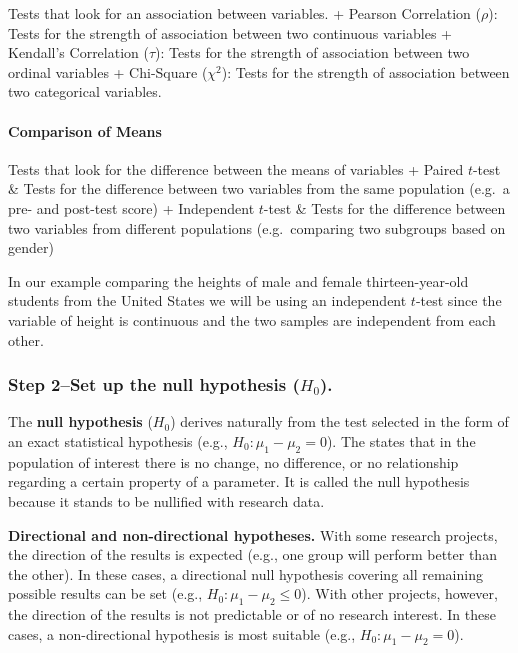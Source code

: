 \documentclass[
]{book}
\theoremstyle{definition}
\theoremstyle{definition}
\theoremstyle{definition}
\theoremstyle{definition}
\theoremstyle{remark}
\begin{document}
Tests that look for an association between variables.
+ Pearson Correlation (\(\rho\)): Tests for the strength of association between two continuous variables
+ Kendall's Correlation (\(\tau\)): Tests for the strength of association between two ordinal variables
+ Chi-Square (\(\chi^2\)): Tests for the strength of association between two categorical variables.

\hypertarget{comparison-of-means}{%
\paragraph*{Comparison of Means}\label{comparison-of-means}}

Tests that look for the difference between the means of variables
+ Paired \(t\)-test \& Tests for the difference between two variables from the same population (e.g.~a pre- and post-test score)
+ Independent \(t\)-test \& Tests for the difference between two variables from different populations (e.g.~comparing two subgroups based on gender)

In our example comparing the heights of male and female thirteen-year-old students from the United States we will be using an independent \(t\)-test since the variable of height is continuous and the two samples are independent from each other.

\hypertarget{step-2set-up-the-null-hypothesis-h_0.}{%
\subsubsection*{\texorpdfstring{Step 2--Set up the null hypothesis (\(H_0\)).}{Step 2--Set up the null hypothesis (H\_0).}}\label{step-2set-up-the-null-hypothesis-h_0.}}

The \textbf{null hypothesis} (\(H_0\)) derives naturally from the test selected in the form of an exact statistical hypothesis (e.g., \(H_0: \mu_1-\mu_2 = 0\)). The states that in the population of interest there is no change, no difference, or no relationship regarding a certain property of a parameter. It is called the null hypothesis because it stands to be nullified with research data.

\textbf{Directional and non-directional hypotheses.} With some research projects, the direction of the results is expected (e.g., one group will perform better than the other). In these cases, a directional null hypothesis covering all remaining possible results can be set (e.g., \(H_0: \mu_1-\mu_2 \leq 0\)). With other projects, however, the direction of the results is not predictable or of no research interest. In these cases, a non-directional hypothesis is most suitable (e.g., \(H_0: \mu_1-\mu_2 = 0\)).
\end{document}
